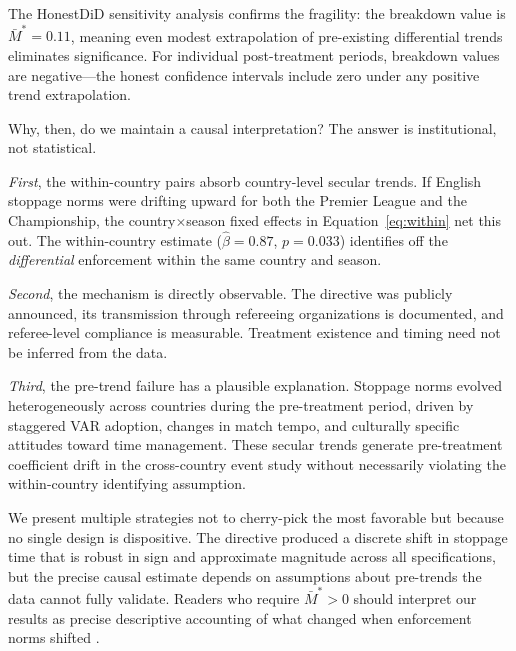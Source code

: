 The \citet{rambachan2023more} HonestDiD sensitivity analysis confirms the
fragility: the breakdown value is $\bar{M}^* = 0.11$, meaning even modest
extrapolation of pre-existing differential trends eliminates significance.
For individual post-treatment periods, breakdown values are negative---the
honest confidence intervals include zero under any positive trend
extrapolation.

Why, then, do we maintain a causal interpretation? The answer is
institutional, not statistical.

\textit{First}, the within-country pairs absorb country-level secular
trends. If English stoppage norms were drifting upward for both the
Premier League and the Championship, the country$\times$season fixed
effects in Equation~\eqref{eq:within} net this out. The within-country
estimate ($\hat{\beta} = 0.87$, $p = 0.033$) identifies off the
\textit{differential} enforcement within the same country and season.

\textit{Second}, the mechanism is directly observable. The directive was
publicly announced, its transmission through refereeing organizations is
documented, and referee-level compliance is measurable. Treatment existence
and timing need not be inferred from the data.

\textit{Third}, the pre-trend failure has a plausible explanation. Stoppage
norms evolved heterogeneously across countries during the pre-treatment
period, driven by staggered VAR adoption, changes in match tempo, and
culturally specific attitudes toward time management. These secular trends
generate pre-treatment coefficient drift in the cross-country event study
without necessarily violating the within-country identifying assumption.

We present multiple strategies not to cherry-pick the most favorable but
because no single design is dispositive. The directive produced a discrete
shift in stoppage time that is robust in sign and approximate magnitude
across all specifications, but the precise causal estimate depends on
assumptions about pre-trends the data cannot fully validate. Readers who
require $\bar{M}^* > 0$ should interpret our results as precise descriptive
accounting of what changed when enforcement norms shifted
\citep{roth2022pretest}.
